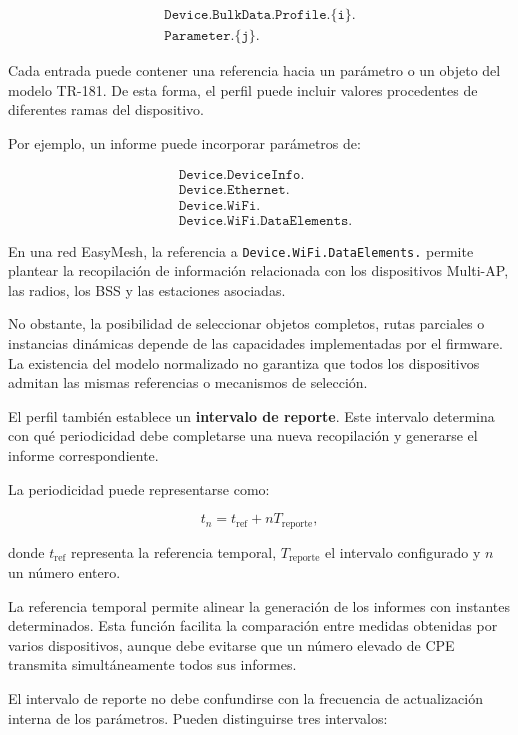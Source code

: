 \[
\begin{split}
    \texttt{Device.BulkData.Profile.\{i\}.}\\
    \texttt{Parameter.\{j\}.}
\end{split}
\]

Cada entrada puede contener una referencia hacia un parámetro o un objeto
del modelo TR-181. De esta forma, el perfil puede incluir valores
procedentes de diferentes ramas del dispositivo.

Por ejemplo, un informe puede incorporar parámetros de:

\[
\begin{aligned}
    &\texttt{Device.DeviceInfo.}\\
    &\texttt{Device.Ethernet.}\\
    &\texttt{Device.WiFi.}\\
    &\texttt{Device.WiFi.DataElements.}
\end{aligned}
\]

En una red EasyMesh, la referencia a
\texttt{Device.WiFi.DataElements.} permite plantear la recopilación de
información relacionada con los dispositivos Multi-AP, las radios, los
BSS y las estaciones asociadas.

No obstante, la posibilidad de seleccionar objetos completos, rutas
parciales o instancias dinámicas depende de las capacidades implementadas
por el firmware. La existencia del modelo normalizado no garantiza que
todos los dispositivos admitan las mismas referencias o mecanismos de
selección.

El perfil también establece un
\textbf{intervalo de reporte}. Este intervalo determina con qué
periodicidad debe completarse una nueva recopilación y generarse el
informe correspondiente.

La periodicidad puede representarse como:

\[
    t_n =
    t_{\mathrm{ref}}
    +
    nT_{\mathrm{reporte}},
\]

donde \(t_{\mathrm{ref}}\) representa la referencia temporal,
\(T_{\mathrm{reporte}}\) el intervalo configurado y \(n\) un número
entero.

La referencia temporal permite alinear la generación de los informes con
instantes determinados. Esta función facilita la comparación entre
medidas obtenidas por varios dispositivos, aunque debe evitarse que un
número elevado de CPE transmita simultáneamente todos sus informes.

El intervalo de reporte no debe confundirse con la frecuencia de
actualización interna de los parámetros. Pueden distinguirse tres
intervalos:

